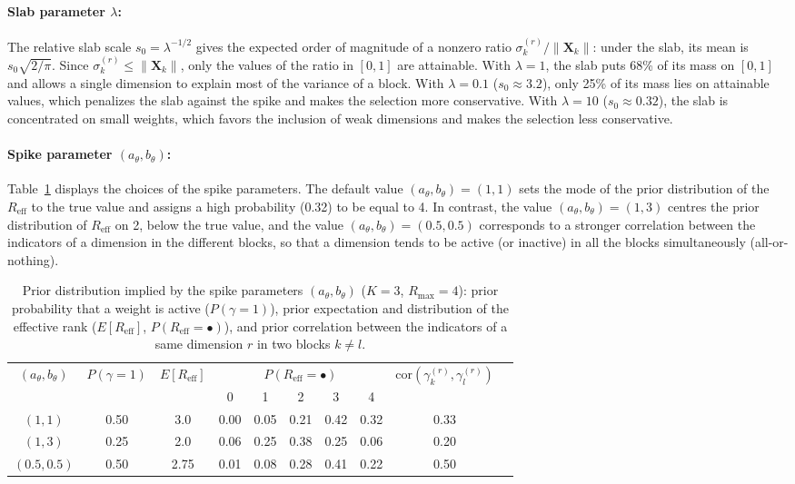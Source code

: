 \documentclass[11pt]{article}
\newcommand{\X}{\mathbf{X}}
\newcommand{\Reff}{R_{\mathrm{eff}}}
\begin{document}
\paragraph{Slab parameter $\lambda$:} The relative slab scale $s_0 = \lambda^{-1/2}$ gives the expected order of magnitude of a nonzero ratio $\sigma_k^{(r)}/\|\X_k\|$: under the slab, its mean is $s_0\sqrt{2/\pi}$. Since $\sigma_k^{(r)}\le\|\X_k\|$, only the values of the ratio in $[0,1]$ are attainable. With $\lambda=1$, the slab puts 68\% of its mass on $[0,1]$ and allows a single dimension to explain most of the variance of a block. With $\lambda=0.1$ ($s_0\approx 3.2$), only 25\% of its mass lies on attainable values, which penalizes the slab against the spike and makes the selection more conservative. With $\lambda=10$ ($s_0\approx 0.32$), the slab is concentrated on small weights, which favors the inclusion of weak dimensions and makes the selection less conservative.

\paragraph{Spike parameter $(a_\theta,b_\theta)$:} Table~\ref{tab:spike_param} displays the choices of the spike parameters. The default value $(a_\theta,b_\theta)=(1,1)$ sets the mode of the prior distribution of the $R_{\mathrm{eff}}$ to the true value and assigns a high probability (0.32) to be equal to 4. In contrast, the value $(a_\theta,b_\theta)=(1,3)$ centres the prior distribution of $\Reff$ on 2, below the true value, and the value $(a_\theta,b_\theta)=(0.5,0.5)$ corresponds to a stronger correlation between the indicators of a dimension in the different blocks, so that a dimension tends to be active (or inactive) in all the blocks simultaneously (all-or-nothing).

\begin{table}
\centering
	\begin{tabular}{cccccccccc}
	\hline
	\multirow{2}{*}{$(a_\theta,b_\theta)$} & \multirow{2}{*}{$P(\gamma=1)$} & \multirow{2}{*}{$E[R_{\mathrm{eff}}]$} & \multicolumn{5}{c}{$P(R_{\mathrm{eff}}=\bullet)$} & \multirow{2}{*}{$\text{cor}(\gamma_k^{(r)},\gamma_l^{(r)})$} \\
	& & & 0 & 1 & 2 & 3 & 4 & \\
	\hline
	$(1,1)$ & 0.50 & 3.0 & 0.00 & 0.05 & 0.21 & 0.42 & 0.32 & 0.33 \\
	$(1,3)$ & 0.25 & 2.0 & 0.06 & 0.25 & 0.38 & 0.25 & 0.06 & 0.20 \\
	$(0.5,0.5)$ & 0.50 & 2.75 & 0.01 & 0.08 & 0.28 & 0.41 & 0.22 & 0.50 \\
	\hline
	\end{tabular}
	\caption{Prior distribution implied by the spike parameters $(a_\theta,b_\theta)$ ($K=3$, $R_{\max}=4$): prior probability that a weight is active ($P(\gamma=1)$), prior expectation and distribution of the effective rank ($E[R_{\mathrm{eff}}]$, $P(R_{\mathrm{eff}}=\bullet)$), and prior correlation between the indicators of a same dimension $r$ in two blocks $k\neq l$.\label{tab:spike_param}}  
\end{table}
\end{document}
